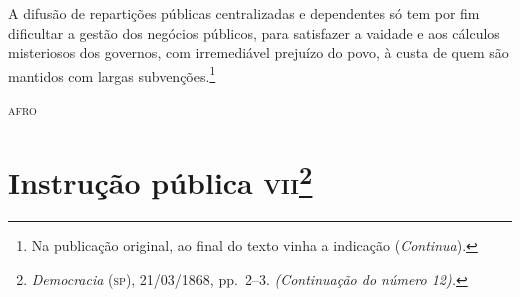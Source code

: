 A difusão de repartições públicas centralizadas e dependentes só tem por
fim dificultar a gestão dos negócios públicos, para satisfazer a vaidade
e aos cálculos misteriosos dos governos, com irremediável prejuízo do
povo, à custa de quem são mantidos com largas subvenções.\footnote{Na publicação original, ao final do texto vinha a indicação (\emph{Continua}).}

\begin{flushright}
\textsc{afro}
\end{flushright}

\chapter{Instrução pública \textsc{vii}\footnote{\emph{Democracia} (\textsc{sp}),
  21/03/1868, pp.~2--3. \emph{(Continuação do número 12).}}}

